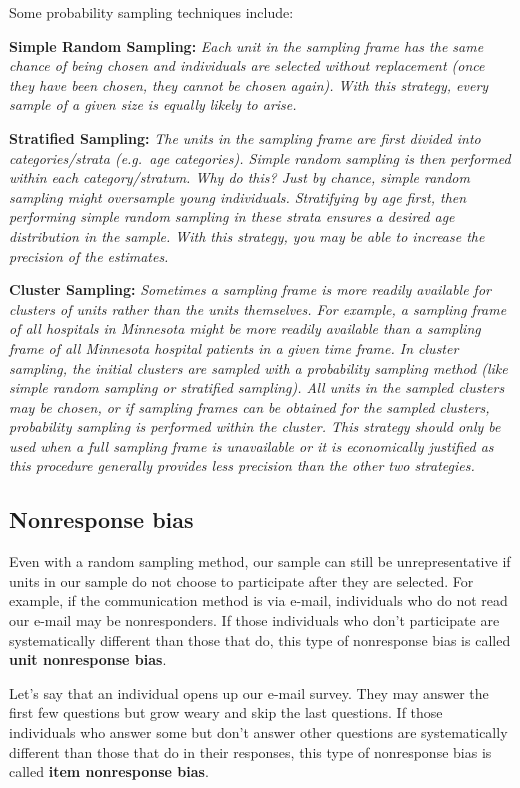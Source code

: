 \documentclass[
]{book}
\begin{document}
Some probability sampling techniques include:

\textbf{Simple Random Sampling:} \emph{Each unit in the sampling frame has the same chance of being chosen and individuals are selected without replacement (once they have been chosen, they cannot be chosen again). With this strategy, every sample of a given size is equally likely to arise.}

\textbf{Stratified Sampling:} \emph{The units in the sampling frame are first divided into categories/strata (e.g.~age categories). Simple random sampling is then performed within each category/stratum. Why do this? Just by chance, simple random sampling might oversample young individuals. Stratifying by age first, then performing simple random sampling in these strata ensures a desired age distribution in the sample. With this strategy, you may be able to increase the precision of the estimates.}

\textbf{Cluster Sampling:} \emph{Sometimes a sampling frame is more readily available for clusters of units rather than the units themselves. For example, a sampling frame of all hospitals in Minnesota might be more readily available than a sampling frame of all Minnesota hospital patients in a given time frame. In cluster sampling, the initial clusters are sampled with a probability sampling method (like simple random sampling or stratified sampling). All units in the sampled clusters may be chosen, or if sampling frames can be obtained for the sampled clusters, probability sampling is performed within the cluster. This strategy should only be used when a full sampling frame is unavailable or it is economically justified as this procedure generally provides less precision than the other two strategies.}

\subsection{Nonresponse bias}\label{nonresponse-bias}

Even with a random sampling method, our sample can still be unrepresentative if units in our sample do not choose to participate after they are selected. For example, if the communication method is via e-mail, individuals who do not read our e-mail may be nonresponders. If those individuals who don't participate are systematically different than those that do, this type of nonresponse bias is called \textbf{unit nonresponse bias}.

Let's say that an individual opens up our e-mail survey. They may answer the first few questions but grow weary and skip the last questions. If those individuals who answer some but don't answer other questions are systematically different than those that do in their responses, this type of nonresponse bias is called \textbf{item nonresponse bias}.
\end{document}
